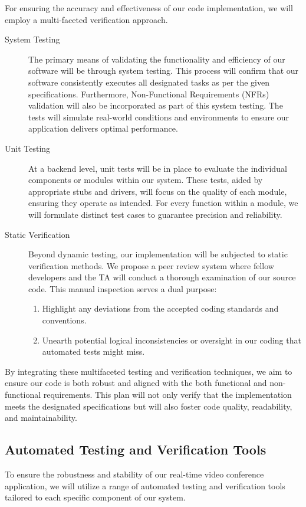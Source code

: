 \documentclass[12pt, titlepage]{article}
\begin{document}
For ensuring the accuracy and effectiveness of our code implementation, we will
employ a multi-faceted verification approach.
\begin{description}
\item[System Testing] The primary means of validating the functionality and
  efficiency of our software will be through system testing. This process will
  confirm that our software consistently executes all designated tasks as per
  the given specifications. Furthermore, Non-Functional Requirements (NFRs)
  validation will also be incorporated as part of this system testing. The tests
  will simulate real-world conditions and environments to ensure our application
  delivers optimal performance.
\item[Unit Testing] At a backend level, unit tests will be in place to evaluate
  the individual components or modules within our system. These tests, aided by
  appropriate stubs and drivers, will focus on the quality of each module,
  ensuring they operate as intended. For every function within a module, we will
  formulate distinct test cases to guarantee precision and reliability.
\item[Static Verification] Beyond dynamic testing, our implementation will be
  subjected to static verification methods. We propose a peer review system
  where fellow developers and the TA will conduct a thorough examination of our
  source code. This manual inspection serves a dual purpose:
  \begin{enumerate}
  \item Highlight any deviations from the accepted coding standards and
    conventions.
  \item Unearth potential logical inconsistencies or oversight in our
    coding that automated tests might miss.
  \end{enumerate}
\end{description}
By integrating these multifaceted testing and verification techniques, we aim to
ensure our code is both robust and aligned with the both functional and
non-functional requirements. This plan will not only verify that the
implementation meets the designated specifications but will also foster code
quality, readability, and maintainability.

\subsection{Automated Testing and Verification Tools}

To ensure the robustness and stability of our real-time video conference
application, we will utilize a range of automated testing and verification tools
tailored to each specific component of our system.
\end{document}
